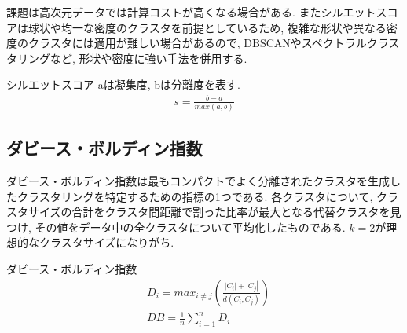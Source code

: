 \documentclass[dvipdfmx, 10pt]{jsarticle}
\begin{document}
課題は高次元データでは計算コストが高くなる場合がある. 
またシルエットスコアは球状や均一な密度のクラスタを前提としているため, 
複雑な形状や異なる密度のクラスタには適用が難しい場合があるので, 
DBSCANやスペクトラルクラスタリングなど, 形状や密度に強い手法を併用する.

\begin{oframed}
    \noindent
    シルエットスコア aは凝集度, bは分離度を表す. 
    \begin{align*}
        s = \frac{b-a}{max(a, b)}  
    \end{align*}
\end{oframed}

\subsection*{ダビース・ボルディン指数}
ダビース・ボルディン指数は最もコンパクトでよく分離されたクラスタを生成したクラスタリングを特定するための指標の1つである. 
各クラスタについて, クラスタサイズの合計をクラスタ間距離で割った比率が最大となる代替クラスタを見つけ, 
その値をデータ中の全クラスタについて平均化したものである. \(k=2\)が理想的なクラスタサイズになりがち. 

\begin{oframed}
    \noindent
    ダビース・ボルディン指数
    \begin{align*}
        & D_i = max_{i \neq j}(\frac{|C_i|+|C_j|}{d(C_i, C_j)}) \\
        & DB = \frac{1}{n} \sum_{i=1}^{n} D_i
    \end{align*}
\end{oframed}
\end{document}

